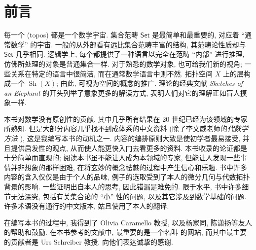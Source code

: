 \chapter{前言}



每一个\topos{} (topos) 都是一个数学宇宙. 集合范畴 $\mathsf {Set}$ 是最简单和最重要的\topos{}, 对应着 ``通常数学'' 的宇宙. 一般的\topos{}从外部看有远比集合范畴丰富的结构, 其范畴论性质却与 $\mathsf {Set}$ 几乎相同. 逻辑学上, 每个\topos{}都提供了一种语言以完全在范畴 ``内部'' 进行推理, 仿佛所处理的对象是普通集合一样. 对于熟悉的数学对象, \topos{}也可给我们新的视角; 一些关系在特定\topos{}的语言中很简洁, 而在通常数学语言中则不然. 拓扑空间 $X$ 上的层构成一个\topos{} $\operatorname{Sh}(X)$; 由此, \topos{}可视为空间的概念的推广. \topos{}理论的经典文献 \textit{Sketches of an Elephant} \cite{Elephant} 的开头列举了意象更多的解读方式, 表明人们对它的理解正如盲人摸象一样.

本书对数学没有原创性的贡献, 其中几乎所有结果在 20 世纪已经为该领域的专家所熟知. 但是大部分内容几乎找不到成体系的中文资料 (除了李文威老师的\emph{代数学方法} \cite{lww2}), 这是我编写本书的动机之一. 内容的编排原则大致是使初学者最易接受, 并且提供启发性的观点, 从而使人能更快入门去看更多的资料. 本书收录的论证都是十分简单而直观的; 阅读本书虽不能让人成为本领域的专家, 但能让人发现一些事情并非想象的那样困难, 在将玄妙的概念祛魅的过程中产生信心和乐趣. 书中许多内容的含入仅仅是由于个人的品味, 例子的选取受到了本人的微分几何与代数拓扑背景的影响. 一些证明出自本人的思考, 因此错漏是难免的. 限于水平, 书中许多细节无法深究, 包括有关集合论的 ``小'' 性的问题, 以及其它涉及到数学基础的问题. 许多术语没有通行的中文版本, 姑且使用了本人的翻译.

在编写本书的过程中, 我得到了 Olivia Caramello 教授, 以及杨家同, 陈潇扬等友人的帮助和鼓励. 在本书参考的文献中, 最重要的是一个名叫 \nlab 的网站, 而其中最主要的贡献者是 Urs Schreiber 教授. 向他们表达诚挚的感谢.



\newpage

~\vspace{4em}


